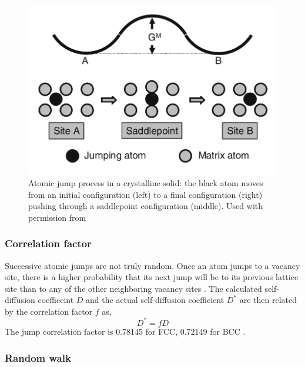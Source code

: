 \documentclass{article}
\begin{document}
\begin{figure}[htp] 
\centering
\includegraphics[scale=0.7]{jumping_atom}
\caption{Atomic jump process in a crystalline solid: the black atom moves from an initial configuration (left) to a final configuration (right) pushing through a saddlepoint configuration (middle). Used with permission from \cite{Mehrer2007}}
\label{fig:2}
\end{figure}

\subsubsection{Correlation factor}

Successive atomic jumps are not truly random. Once an atom jumps to a vacancy site, there is a higher probability that its next jump will be to its previous lattice site than to any of the other neighboring vacancy sites \cite{Leclaire}. The calculated self-diffusion coefficeint $D$ and the actual self-diffusion coefficient $D^*$ are then related by the correlation factor $f$ as,
%
\begin{equation} \label{eq:4}
D^* = fD
\end{equation}
%
The jump correlation factor is 0.78145 for FCC, 0.72149 for BCC \cite{Montet1973}. 

\subsubsection{Random walk}
\end{document}
